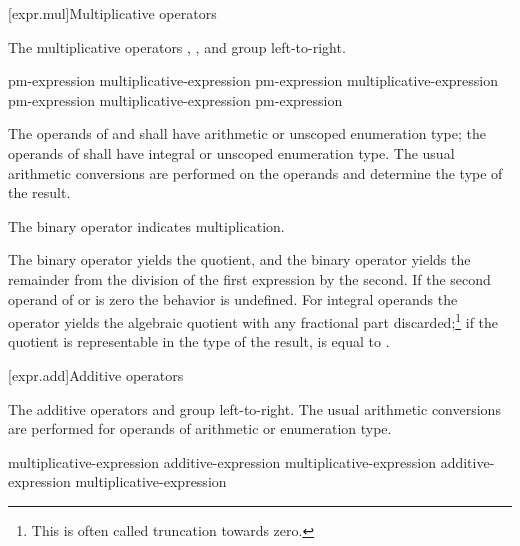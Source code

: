 [expr.mul]{Multiplicative operators}%
%

\pnum
The multiplicative operators \tcode{*}, \tcode{/}, and \tcode{\%} group
left-to-right.

%
%
%
%
%
%
%
%
\begin{bnf}
\br
    pm-expression\br
    multiplicative-expression \terminal{*} pm-expression\br
    multiplicative-expression \terminal{/} pm-expression\br
    multiplicative-expression \terminal{\%} pm-expression
\end{bnf}

\pnum
The operands of \tcode{*} and \tcode{/} shall have arithmetic or unscoped
enumeration type; the operands of \tcode{\%} shall have integral or unscoped
enumeration type. The usual arithmetic conversions are performed on the
operands and determine the type of the result.

\pnum
The binary \tcode{*} operator indicates multiplication.

\pnum
The binary \tcode{/} operator yields the quotient, and the binary
\tcode{\%} operator yields the remainder from the division of the first
expression by the second.
%
If the second operand of \tcode{/} or \tcode{\%} is zero the behavior is
undefined.
For integral operands the \tcode{/} operator yields the algebraic quotient with
any fractional part discarded;\footnote{This is often called truncation towards
zero.} if the quotient  is representable in the type of the result,
 is equal to .

[expr.add]{Additive operators}%
%

\pnum
The additive operators \tcode{+} and \tcode{-} group left-to-right. The
usual arithmetic conversions are performed for operands of arithmetic or
enumeration type.

%
%
%
%
%
\begin{bnf}
\br
    multiplicative-expression\br
    additive-expression \terminal{+} multiplicative-expression\br
    additive-expression \terminal{-} multiplicative-expression
\end{bnf}


